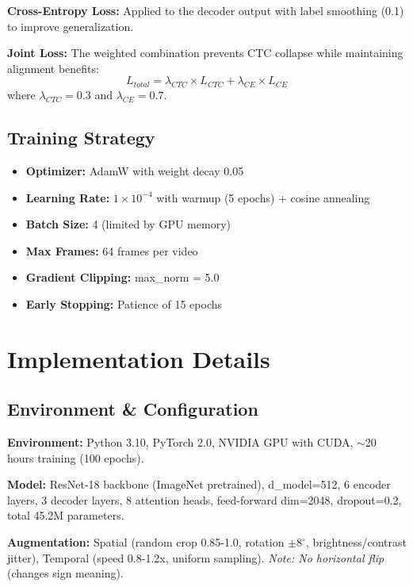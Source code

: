 \documentclass[12pt,a4paper]{article}
\begin{document}
\textbf{Cross-Entropy Loss:} Applied to the decoder output with label smoothing (0.1) to improve generalization.

\textbf{Joint Loss:} The weighted combination prevents CTC collapse while maintaining alignment benefits:
\begin{equation}
L_{total} = \lambda_{CTC} \times L_{CTC} + \lambda_{CE} \times L_{CE}
\end{equation}
where $\lambda_{CTC} = 0.3$ and $\lambda_{CE} = 0.7$.

\subsection{Training Strategy}

\begin{itemize}[noitemsep]
    \item \textbf{Optimizer:} AdamW with weight decay 0.05
    \item \textbf{Learning Rate:} $1 \times 10^{-4}$ with warmup (5 epochs) + cosine annealing
    \item \textbf{Batch Size:} 4 (limited by GPU memory)
    \item \textbf{Max Frames:} 64 frames per video
    \item \textbf{Gradient Clipping:} max\_norm = 5.0
    \item \textbf{Early Stopping:} Patience of 15 epochs
\end{itemize}

\section{Implementation Details}

\subsection{Environment \& Configuration}

\textbf{Environment:} Python 3.10, PyTorch 2.0, NVIDIA GPU with CUDA, $\sim$20 hours training (100 epochs).

\textbf{Model:} ResNet-18 backbone (ImageNet pretrained), d\_model=512, 6 encoder layers, 3 decoder layers, 8 attention heads, feed-forward dim=2048, dropout=0.2, total 45.2M parameters.

\textbf{Augmentation:} Spatial (random crop 0.85-1.0, rotation $\pm 8^{\circ}$, brightness/contrast jitter), Temporal (speed 0.8-1.2x, uniform sampling). \textit{Note: No horizontal flip} (changes sign meaning).
\end{document}
